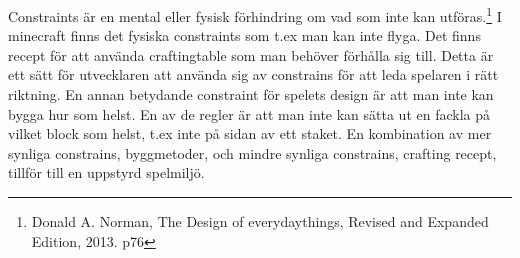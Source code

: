 Constraints är en mental eller fysisk förhindring om vad som inte kan utföras.\footnote{Donald A. Norman, The Design of everydaythings, Revised and Expanded Edition, 2013. p76}
I minecraft finns det fysiska constraints som t.ex man kan inte flyga. Det finns recept för att använda craftingtable som man behöver förhålla sig till. Detta är ett sätt för utvecklaren att använda sig av constrains för att leda spelaren i rätt riktning.
En annan betydande constraint för spelets design är att man inte kan bygga hur som helst. En av de regler är att man inte kan sätta ut en fackla på vilket block som helst, t.ex inte på sidan av ett staket.
En kombination av mer synliga constrains, byggmetoder, och mindre synliga constrains, crafting recept, tillför till en uppstyrd spelmiljö.
